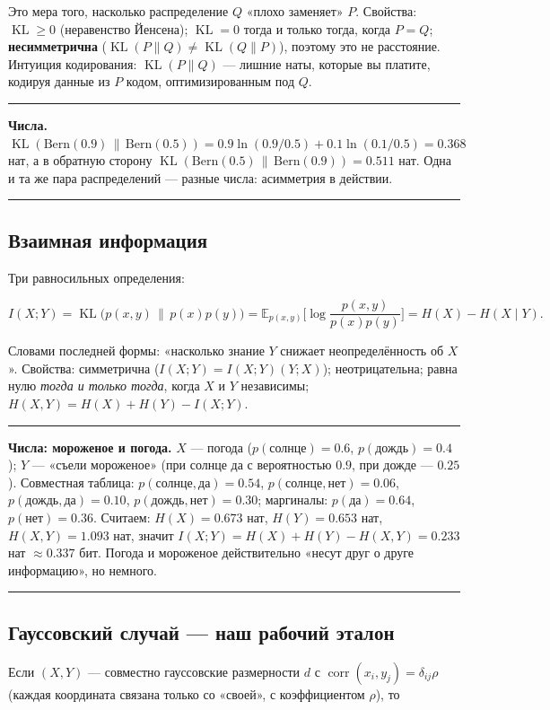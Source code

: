 \documentclass[11pt]{article}
\newcommand{\MI}{I(X;Y)}
\newcommand{\KL}{\operatorname{KL}}
\newcommand{\EE}{\mathbb{E}}
\newenvironment{exbox}{%
  \par\medskip\noindent
  \begin{minipage}[t]{\linewidth}
  \color{accent}\rule[2pt]{\linewidth}{0.6pt}\color{black}
  \vspace{0.4em}\noindent\small
}{%
  \vspace{0.4em}
  \color{accent}\rule[2pt]{\linewidth}{0.6pt}\color{black}
  \end{minipage}\par\medskip
}
\begin{document}
Это мера того, насколько распределение $Q$ «плохо заменяет» $P$. Свойства: $\KL\ge 0$ (неравенство Йенсена); $\KL=0$ тогда и только тогда, когда $P=Q$; \textbf{несимметрична} ($\KL(P\|Q)\neq\KL(Q\|P)$), поэтому это не расстояние. Интуиция кодирования: $\KL(P\|Q)$ — лишние наты, которые вы платите, кодируя данные из $P$ кодом, оптимизированным под $Q$.

\begin{exbox}
\textbf{Числа.} $\KL(\mathrm{Bern}(0.9)\,\|\,\mathrm{Bern}(0.5)) = 0.9\ln(0.9/0.5)+0.1\ln(0.1/0.5)=0.368$ нат, а в обратную сторону $\KL(\mathrm{Bern}(0.5)\,\|\,\mathrm{Bern}(0.9))=0.511$ нат. Одна и та же пара распределений — разные числа: асимметрия в действии.
\end{exbox}

\subsection{Взаимная информация}

Три равносильных определения:

\[
\MI = \KL\big(p(x,y)\,\|\,p(x)p(y)\big)
   = \EE_{p(x,y)}\Big[\log\frac{p(x,y)}{p(x)p(y)}\Big]
   = H(X)-H(X\mid Y).
\]

Словами последней формы: «насколько знание $Y$ снижает неопределённость об $X$». Свойства: симметрична ($\MI=\MI(Y;X)$); неотрицательна; равна нулю \emph{тогда и только тогда}, когда $X$ и $Y$ независимы; $H(X,Y)=H(X)+H(Y)-\MI$.

\begin{exbox}
\textbf{Числа: мороженое и погода.} $X$ — погода ($p(\text{солнце})=0.6$, $p(\text{дождь})=0.4$); $Y$ — «съели мороженое» (при солнце да с вероятностью $0.9$, при дожде — $0.25$). Совместная таблица: $p(\text{солнце},\text{да})=0.54$, $p(\text{солнце},\text{нет})=0.06$, $p(\text{дождь},\text{да})=0.10$, $p(\text{дождь},\text{нет})=0.30$; маргиналы: $p(\text{да})=0.64$, $p(\text{нет})=0.36$. Считаем: $H(X)=0.673$ нат, $H(Y)=0.653$ нат, $H(X,Y)=1.093$ нат, значит $\MI=H(X)+H(Y)-H(X,Y)=0.233$ нат $\approx 0.337$ бит. Погода и мороженое действительно «несут друг о друге информацию», но немного.
\end{exbox}

\subsection{Гауссовский случай — наш рабочий эталон}

Если $(X,Y)$ — совместно гауссовские размерности $d$ с $\operatorname{corr}(x_i,y_j)=\delta_{ij}\rho$ (каждая координата связана только со «своей», с коэффициентом $\rho$), то
\end{document}
